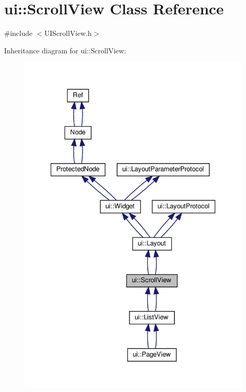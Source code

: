 \hypertarget{classui_1_1ScrollView}{}\section{ui\+:\+:Scroll\+View Class Reference}
\label{classui_1_1ScrollView}


{\ttfamily \#include $<$U\+I\+Scroll\+View.\+h$>$}



Inheritance diagram for ui\+:\+:Scroll\+View\+:
\nopagebreak
\begin{figure}[H]
\begin{center}
\leavevmode
\includegraphics[width=329pt]{classui_1_1ScrollView__inherit__graph}
\end{center}
\end{figure}


